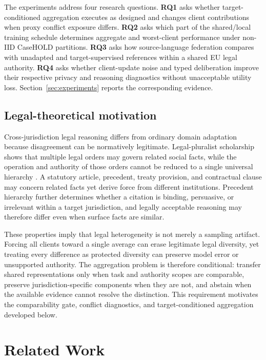 \documentclass[a4paper,fleqn]{cas-sc}
\begin{document}
The experiments address four research questions. \textbf{RQ1} asks whether target-conditioned aggregation executes as designed and changes client contributions when proxy conflict exposure differs. \textbf{RQ2} asks which part of the shared/local training schedule determines aggregate and worst-client performance under non-IID CaseHOLD partitions. \textbf{RQ3} asks how source-language federation compares with unadapted and target-supervised references within a shared EU legal authority. \textbf{RQ4} asks whether client-update noise and typed deliberation improve their respective privacy and reasoning diagnostics without unacceptable utility loss. Section~\ref{sec:experiments} reports the corresponding evidence.

\subsection{Legal-theoretical motivation}

Cross-jurisdiction legal reasoning differs from ordinary domain adaptation because disagreement can be normatively legitimate. Legal-pluralist scholarship shows that multiple legal orders may govern related social facts, while the operation and authority of those orders cannot be reduced to a single universal hierarchy \citep{griffiths1986legal,merry1988legal}. A statutory article, precedent, treaty provision, and contractual clause may concern related facts yet derive force from different institutions. Precedent hierarchy further determines whether a citation is binding, persuasive, or irrelevant within a target jurisdiction, and legally acceptable reasoning may therefore differ even when surface facts are similar.

These properties imply that legal heterogeneity is not merely a sampling artifact. Forcing all clients toward a single average can erase legitimate legal diversity, yet treating every difference as protected diversity can preserve model error or unsupported authority. The aggregation problem is therefore conditional: transfer shared representations only when task and authority scopes are comparable, preserve jurisdiction-specific components when they are not, and abstain when the available evidence cannot resolve the distinction. This requirement motivates the comparability gate, conflict diagnostics, and target-conditioned aggregation developed below.

\section{Related Work}
\end{document}
